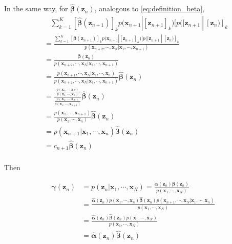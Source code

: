 \documentclass[a4]{article}
\begin{document}
In the same way, for $\bm{\hat{\beta}}(\bm{z}_n)$, analogous to \ref{eq:definition_beta},
\begin{equation}
\begin{aligned}
&
\:\:\:\:
\sum_{k=1}^K [\bm{\hat{\beta}}(\bm{z}_{n+1})]_k 
p( \bm{x}_{n+1} | [\bm{z}_{n+1}]_k )[p([\bm{z}_{n+1} \:|\ [\bm{z}_{n})]_k\\
&=
\frac{
\sum_{k=1}^K [\bm{\beta}(\bm{z}_{n+1})]_k 
p( \bm{x}_{n+1} | [\bm{z}_{n+1}]_k )[p([\bm{z}_{n+1} \:|\ [\bm{z}_{n})]_k
}{p( \bm{x}_{n+2}, \cdots, \bm{x}_{N} | \bm{x}_{1}, \cdots, \bm{x}_{n+1} ) }\\
&=
\frac{
    \bm{\beta}(\bm{z}_{n})
}
{
    p( \bm{x}_{n+2}, \cdots, \bm{x}_{N} | \bm{x}_{1}, \cdots, \bm{x}_{n+1} )
}\\
&=
\frac{
    p( \bm{x}_{n+1}, \cdots, \bm{x}_{N} | \bm{x}_{1}, \cdots, \bm{x}_{n} )
}
{
    p( \bm{x}_{n+2}, \cdots, \bm{x}_{N} | \bm{x}_{1}, \cdots, \bm{x}_{n+1} )
}
\bm{\hat{\beta}}(\bm{z}_{n})\\
&=
\frac{
    \frac{
        p( \bm{x}_{1}, \cdots, \bm{x}_{N} )
    }
    {
        p( \bm{x}_{1}, \cdots, \bm{x}_{n} )
    }
}
{
    \frac{
        p( \bm{x}_{1}, \cdots, \bm{x}_{N} )
    }
    {
        p( \bm{x}_{1}, \cdots, \bm{x}_{n+1} )
    }
}
\bm{\hat{\beta}}(\bm{z}_{n})\\
&=
\frac{
    p( \bm{x}_{1}, \cdots, \bm{x}_{n+1} )
}
{
    p( \bm{x}_{1}, \cdots, \bm{x}_{n} )
}
\bm{\hat{\beta}}(\bm{z}_{n})\\
&=
p( \bm{x}_{n+1} | \bm{x}_{1}, \cdots, \bm{x}_{n} )\bm{\hat{\beta}}(\bm{z}_{n})\\
&=
c_{n+1}\bm{\hat{\beta}}(\bm{z}_{n})
\\
\end{aligned}
\end{equation}

Then 

\begin{equation}
\begin{aligned}
\bm{\gamma}(\bm{z}_n) &= p(\bm{z}_n|\bm{x}_1, \cdots, \bm{x}_N)
= \frac{
    \bm{\alpha}(\bm{z}_n)
    \bm{\beta}(\bm{z}_n)
}
{
    p(\bm{x}_1, \cdots, \bm{x}_N)
}\\
&= \frac{
    \bm{\hat{\alpha}}(\bm{z}_n)p(\bm{x}_1, \cdots, \bm{x}_n)
    \bm{\hat{\beta}}(\bm{z}_n)p(\bm{x}_{n+1}, \cdots, \bm{x}_N|\bm{x}_{1}, \cdots, \bm{x}_n)
}
{
    p(\bm{x}_1, \cdots, \bm{x}_N)
}\\
&= \frac{
    \bm{\hat{\alpha}}(\bm{z}_n)
    \bm{\hat{\beta}}(\bm{z}_n)p(\bm{x}_1, \cdots, \bm{x}_N)
}
{
    p(\bm{x}_1, \cdots, \bm{x}_N)
}\\
&= \bm{\hat{\alpha}}(\bm{z}_n)\bm{\hat{\beta}}(\bm{z}_n)
\end{aligned}
\end{equation}
\end{document}
